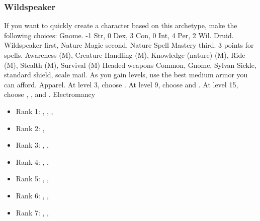         \subsubsection{Wildspeaker}
            If you want to quickly create a character based on this archetype, make the following choices:
             Gnome.
             -1 Str, 0 Dex, 3 Con, 0 Int, 4 Per, 2 Wil.
             Druid.
             Wildspeaker first, Nature Magic second, Nature Spell Mastery third.
             3 points for spells.
             Awareness (M), Creature Handling (M), Knowledge (nature) (M), Ride (M), Stealth (M), Survival (M)
             Headed weapons
             Common, Gnome, Sylvan
             Sickle, standard shield, scale mail. As you gain levels, use the best medium armor you can afford.
             Apparel.
                At level 3, choose .
                At level 9, choose  and .
                At level 15, choose , , and .
             Electromancy
            \begin{itemize}
                \item Rank 1: , , , 
                \item Rank 2: , 
                \item Rank 3: , , 
                \item Rank 4: , , 
                \item Rank 5: , , 
                \item Rank 6: , , 
                \item Rank 7: , , 
            \end{itemize}
